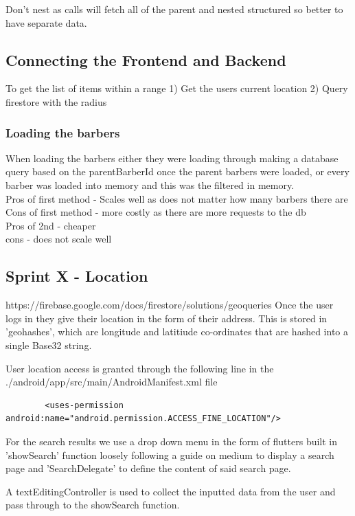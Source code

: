 \documentclass[12pt]{article}
\begin{document}
	Don't nest as calls will fetch all of the parent and nested structured so better to have separate data.
	
	\subsection{Connecting the Frontend and Backend}
	To get the list of items within a range
	1) Get the users current location
	2) Query firestore with the radius
	
	\subsubsection{Loading the barbers}
	When loading the barbers either they were loading through making a database query based on the parentBarberId once the parent barbers were loaded, or every barber was loaded into memory and this was the filtered in memory.
	\\
	Pros of first method - Scales well as does not matter how many barbers there are
	\\
	Cons of first method - more costly as there are more requests to the db
	\\
	Pros of 2nd - cheaper
	\\
	cons - does not scale well
	
	\subsection{Sprint X - Location}
	https://firebase.google.com/docs/firestore/solutions/geoqueries
	Once the user logs in they give their location in the form of their address. This is stored in 'geohashes', which are longitude and latitiude co-ordinates that are hashed into a single Base32 string.
	
	User location access is granted through the following line in the ./android/app/src/main/AndroidManifest.xml file
	\begin{lstlisting}
		<uses-permission android:name="android.permission.ACCESS_FINE_LOCATION"/>
	\end{lstlisting}
	For the search results we use a drop down menu in the form of flutters built in 'showSearch' function loosely following a guide on medium \cite{medium-comerge} to display a search page and 'SearchDelegate' to define the content of said search page.
	
	A textEditingController is used to collect the inputted data from the user and pass through to the showSearch function.
	
\end{document}
